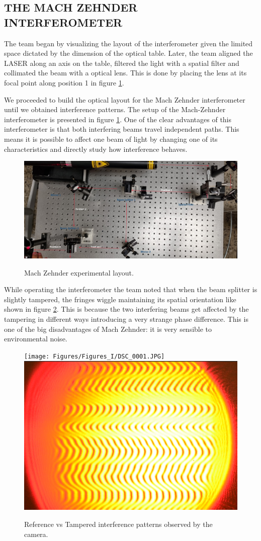 \label{sec:RESULTS}

\subsection{THE MACH ZEHNDER INTERFEROMETER}
The team began by visualizing the layout of the interferometer given the limited space dictated by the dimension of the optical table. Later, the team aligned the LASER along an axis on the table, filtered the light with a spatial filter and collimated the beam with a optical lens. This is done by placing the lens at its focal point along position 1 in figure \ref{fig:Setup_MZ}. 

We proceeded to build the optical layout for the Mach Zehnder interferometer until we obtained interference patterns. The setup of the Mach-Zehnder interferometer is presented in figure \ref{fig:Setup_MZ}. One of the clear advantages of this interferometer is that both interfering beams travel independent paths. This means it is possible to affect one beam of light by changing one of its characteristics and directly study how interference behaves. 

\begin{figure}[H]
    \centering
    \includegraphics[scale=0.20]{Figures/Figures_I/Mach_Zehnder_ExperimentalSetup.png}
    \label{fig:Setup_MZ}
    \caption{Mach Zehnder experimental layout.}
\end{figure}

While operating the interferometer the team noted that when the beam splitter is slightly tampered, the fringes wiggle maintaining its spatial orientation like shown in figure \ref{fig:Tampered_MZ}. This is because the two interfering beams get affected by the tampering in different ways introducing a very strange phase difference. This is one of the big disadvantages of Mach Zehnder: it is very sensible to environmental noise.

\begin{figure} [H]
    \texttt{[image: Figures/Figures\_I/DSC\_0001.JPG]}\hfill
    \includegraphics[width=.20\textwidth]{Figures/Figures_I/Tampered_MZ.png}\hfill
    \caption{Reference vs Tampered interference patterns observed by the camera.}
    \label{fig:Tampered_MZ}
\end{figure}

